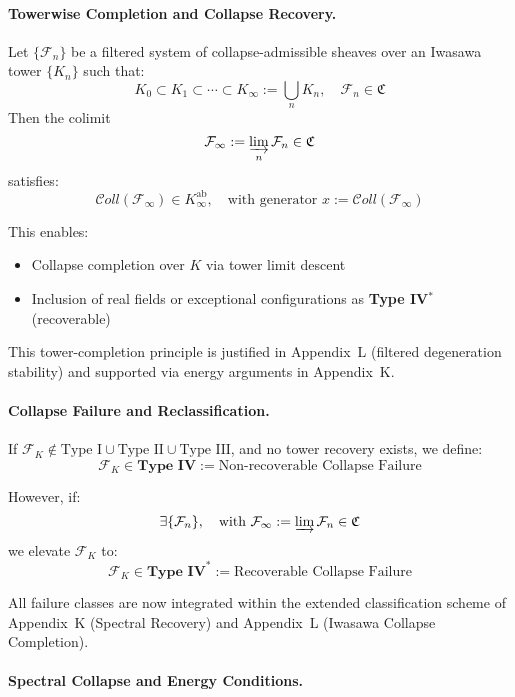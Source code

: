 \documentclass[11pt]{article}
\begin{document}
\vspace{1em}
\paragraph{Towerwise Completion and Collapse Recovery.}

Let \( \{ \mathcal{F}_n \} \) be a filtered system of collapse-admissible sheaves over an Iwasawa tower \( \{ K_n \} \) such that:
\[
K_0 \subset K_1 \subset \cdots \subset K_\infty := \bigcup_{n} K_n, \quad \mathcal{F}_n \in \mathfrak{C}
\]
Then the colimit
\[
\mathcal{F}_\infty := \varinjlim_n \mathcal{F}_n \in \mathfrak{C}
\]
satisfies:
\[
\mathcal{C}oll(\mathcal{F}_\infty) \in K_\infty^{\mathrm{ab}}, \quad \text{with generator } x := \mathcal{C}oll(\mathcal{F}_\infty)
\]

This enables:
\begin{itemize}
    \item Collapse completion over \( K \) via tower limit descent
    \item Inclusion of real fields or exceptional configurations as \textbf{Type IV}$^{\ast}$ (recoverable)
\end{itemize}

This tower-completion principle is justified in Appendix~L (filtered degeneration stability) and supported via energy arguments in Appendix~K.

\vspace{1em}
\paragraph{Collapse Failure and Reclassification.}

If \( \mathcal{F}_K \notin \text{Type I} \cup \text{Type II} \cup \text{Type III} \), and no tower recovery exists, we define:
\[
\mathcal{F}_K \in \textbf{Type IV} := \text{Non-recoverable Collapse Failure}
\]

However, if:
\[
\exists \{ \mathcal{F}_n \}, \quad \text{with } \mathcal{F}_\infty := \varinjlim \mathcal{F}_n \in \mathfrak{C}
\]
we elevate \( \mathcal{F}_K \) to:
\[
\mathcal{F}_K \in \textbf{Type IV}^{\ast} := \text{Recoverable Collapse Failure}
\]

All failure classes are now integrated within the extended classification scheme of Appendix~K (Spectral Recovery) and Appendix~L (Iwasawa Collapse Completion).

\vspace{1em}
\paragraph{Spectral Collapse and Energy Conditions.}
\end{document}

